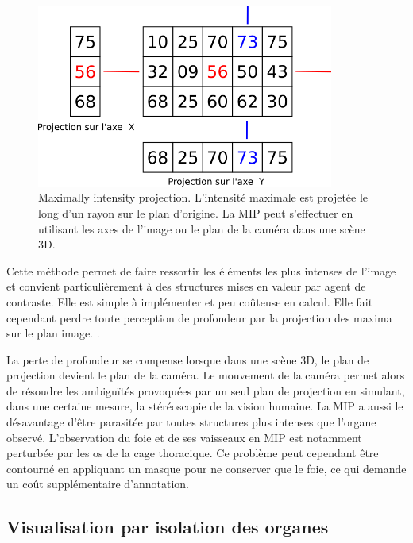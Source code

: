       \begin{figure}[h]
        \centering
        \includegraphics[height=6cm]{Images/3D_mip_ray.png}
        \caption{Maximally intensity projection. L'intensité maximale est projetée le long d'un rayon sur le plan d'origine. La MIP peut s'effectuer en utilisant les axes de l'image ou le plan de la caméra dans une scène 3D.}
        \label{fig:MIP_visualisation}
      \end{figure}

      Cette méthode permet de faire ressortir les éléments les plus intenses de l'image et convient particulièrement à des structures mises en valeur par agent de contraste. Elle est simple à implémenter et peu coûteuse en calcul. Elle fait cependant perdre toute perception de profondeur par la projection des maxima sur le plan image. .

      La perte de profondeur se compense lorsque dans une scène 3D, le plan de projection devient le plan de la caméra. Le mouvement de la caméra permet alors de résoudre les ambiguïtés provoquées par un seul plan de projection en simulant, dans une certaine mesure, la stéréoscopie de la vision humaine.
      La MIP a aussi le désavantage d'être parasitée par toutes structures plus intenses que l'organe observé. L'observation du foie et de ses vaisseaux en MIP est notamment perturbée par les os de la cage thoracique. Ce problème peut cependant être contourné en appliquant un masque pour ne conserver que le foie, ce qui demande un coût supplémentaire d'annotation.

      \subsection{Visualisation par isolation des organes}
      
